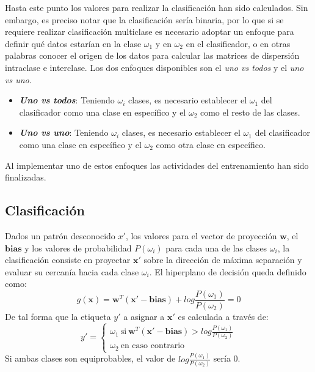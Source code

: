 \documentclass[journal]{IEEEtran}
\begin{document}
Hasta este punto los valores para realizar la clasificación han sido calculados.
Sin embargo, es preciso notar que la clasificación sería binaria, por lo que si se requiere realizar clasificación multiclase es necesario adoptar un enfoque para definir qué datos estarían en la clase $\omega_1$ y en $\omega_2$ en el clasificador, o en otras palabras conocer el origen de los datos para calcular las matrices de dispersión intraclase e interclase.
Los dos enfoques disponibles son el \emph{uno vs todos} y el \emph{uno vs uno}.
\begin{itemize}
	\item \textbf{\emph{Uno vs todos}}: Teniendo $\omega_i$ clases, es necesario establecer el $\omega_1$ del clasificador como una clase en específico y el $\omega_2$ como el resto de las clases.
	\item \textbf{\emph{Uno vs uno}}: Teniendo $\omega_i$ clases, es necesario establecer el $\omega_1$ del clasificador como una clase en específico y el $\omega_2$ como otra clase en específico.
\end{itemize}
Al implementar uno de estos enfoques las actividades del entrenamiento han sido finalizadas.

\subsection{Clasificación} %
\label{sub:clasificacion}
Dados un patrón desconocido $x'$, los valores para el vector de proyección $\mathbf{w}$, el $\mathbf{bias}$ y los valores de probabilidad $P(\omega_i)$ para cada una de las clases $\omega_i$, la clasificación consiste en proyectar $\mathbf{x'}$ sobre la dirección de máxima separación y evaluar su cercanía hacia cada clase $\omega_i$.
El hiperplano de decisión queda definido como:
\begin{equation}
g(\mathbf{x}) = \mathbf{w}^T (\mathbf{x'} - \mathbf{bias}) + log\frac{P(\omega_1)}{P(\omega_2)} = 0
\end{equation}
De tal forma que la etiqueta $y'$ a asignar a $\mathbf{x'}$ es calculada a través de:
\begin{equation}
y'=\left\{\begin{matrix}
\omega_1~\text{si}~\mathbf{w}^T (\mathbf{x'} - \mathbf{bias}) > log\frac{P(\omega_1)}{P(\omega_2)} \\
\omega_2~\text{en caso contrario}
\end{matrix}\right.
\end{equation}
Si ambas clases son equiprobables, el valor de $log\frac{P(\omega_1)}{P(\omega_2)}$ sería 0.
\end{document}
